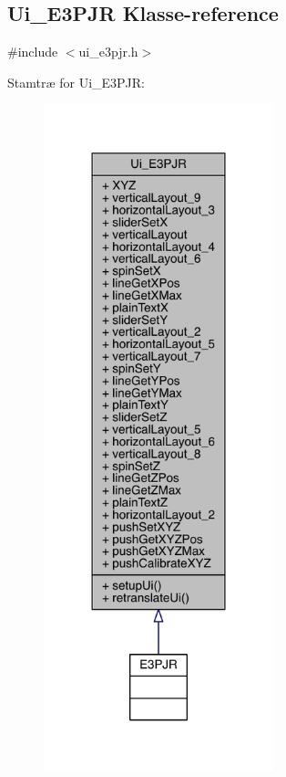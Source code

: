\hypertarget{class_ui___e3_p_j_r}{}\subsection{Ui\+\_\+\+E3\+P\+JR Klasse-\/reference}
\label{class_ui___e3_p_j_r}


{\ttfamily \#include $<$ui\+\_\+e3pjr.\+h$>$}



Stamtræ for Ui\+\_\+\+E3\+P\+JR\+:
\nopagebreak
\begin{figure}[H]
\begin{center}
\leavevmode
\includegraphics[width=189pt]{d0/d34/class_ui___e3_p_j_r__inherit__graph}
\end{center}
\end{figure}


